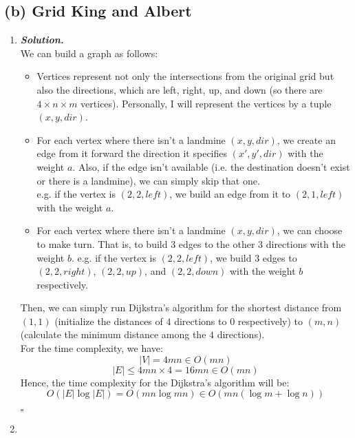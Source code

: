\documentclass[12pt, a4paper, UTF8]{article}
\newenvironment{solution}[1][\it{Solution}]{\textbf{#1. }\\}{\begin{flushright}$\square$\end{flushright}}
\begin{document}
    \subsection*{(b) Grid King and Albert}
        \begin{enumerate}
            \item
                \begin{solution}
                    We can build a graph as follows:
                    \begin{itemize}
                        \item Vertices represent not only the intersections from the original grid but also the directions, which are left, right, up, and down (so there are $4 \times n \times m$ vertices). Personally, I will represent the vertices by a tuple $(x, y, dir)$.
                        \item For each vertex where there isn't a landmine $(x, y, dir)$, we create an edge from it forward the direction it specifies $(x', y', dir)$ with the weight $a$. Also, if the edge isn't available (i.e. the destination doesn't exist or there is a landmine), we can simply skip that one.\\
                            e.g. if the vertex is $(2, 2, left)$, we build an edge from it to $(2, 1, left)$ with the weight $a$.
                        \item 
                            For each vertex where there isn't a landmine $(x, y, dir)$, we can choose to make turn. That is, to build $3$ edges to the other $3$ directions with the weight $b$.
                            e.g. if the vertex is $(2, 2, left)$, we build $3$ edges to $(2, 2, right)$, $(2, 2, up)$, and $(2, 2, down)$ with the weight $b$ respectively.
                    \end{itemize}
                    Then, we can simply run Dijkstra's algorithm for the shortest distance from $(1, 1)$ (initialize the distances of $4$ directions to $0$ respectively) to $(m, n)$ (calculate the minimum distance among the $4$ directions).\\
                    For the time complexity, we have: 
                    $$|V| = 4mn \in O(mn)$$
                    $$|E| \le 4mn \times 4 = 16mn \in O(mn)$$
                    Hence, the time complexity for the Dijkstra's algorithm will be:
                    $$O(|E|\log{|E|}) = O(mn\log{mn}) \in O(mn(\log{m} + \log{n}))$$
                \end{solution}
            \item

\end{enumerate}
\end{document}
